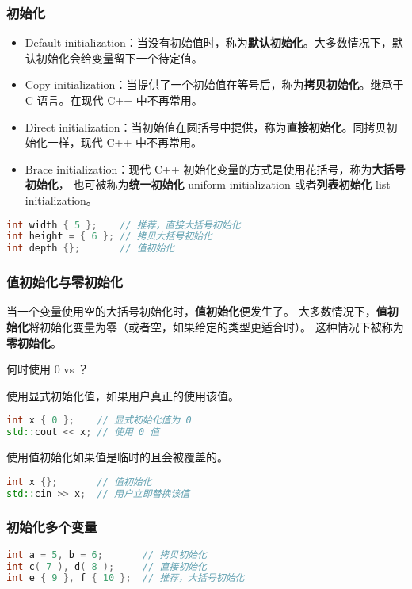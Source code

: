 \documentclass[../../LearnCpp.tex]{subfiles}
\begin{document}

\subsubsection*{初始化}

\begin{itemize}
  \item Default initialization：当没有初始值时，称为\textbf{默认初始化}。大多数情况下，默认初始化会给变量留下一个待定值。
  \item Copy initialization：当提供了一个初始值在等号后，称为\textbf{拷贝初始化}。继承于 C 语言。在现代 C++ 中不再常用。
  \item Direct initialization：当初始值在圆括号中提供，称为\textbf{直接初始化}。同拷贝初始化一样，现代 C++ 中不再常用。
  \item Brace initialization：现代 C++ 初始化变量的方式是使用花括号，称为\textbf{大括号初始化}，
        也可被称为\textbf{统一初始化} uniform initialization 或者\textbf{列表初始化} list initialization。
\end{itemize}


\begin{lstlisting}[language=C++]
int width { 5 };    // 推荐，直接大括号初始化
int height = { 6 }; // 拷贝大括号初始化
int depth {};       // 值初始化
\end{lstlisting}


\subsubsection*{值初始化与零初始化}

当一个变量使用空的大括号初始化时，\textbf{值初始化}便发生了。
大多数情况下，\textbf{值初始化}将初始化变量为零（或者空，如果给定的类型更适合时）。
这种情况下被称为\textbf{零初始化}。

何时使用 { 0 } vs {}？

使用显式初始化值，如果用户真正的使用该值。

\begin{lstlisting}[language=C++]
int x { 0 };    // 显式初始化值为 0
std::cout << x; // 使用 0 值
\end{lstlisting}

使用值初始化如果值是临时的且会被覆盖的。

\begin{lstlisting}[language=C++]
int x {};       // 值初始化
std::cin >> x;  // 用户立即替换该值
\end{lstlisting}

\subsubsection*{初始化多个变量}

\begin{lstlisting}[language=C++]
int a = 5, b = 6;       // 拷贝初始化
int c( 7 ), d( 8 );     // 直接初始化
int e { 9 }, f { 10 };  // 推荐，大括号初始化
\end{lstlisting}
\end{document}
